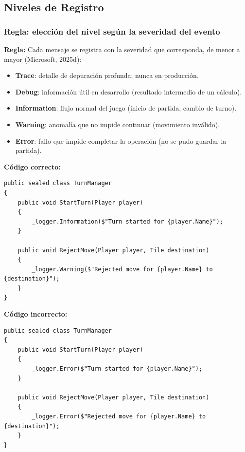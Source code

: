 \subsection{Niveles de Registro}

\subsubsection{Regla: elección del nivel según la severidad del evento}

\textbf{Regla:} Cada mensaje se registra con la severidad que corresponda, de menor a mayor (Microsoft, 2025d):

\begin{itemize}
  \item \textbf{Trace}: detalle de depuración profunda; nunca en producción.
  \item \textbf{Debug}: información útil en desarrollo (resultado intermedio de un cálculo).
  \item \textbf{Information}: flujo normal del juego (inicio de partida, cambio de turno).
  \item \textbf{Warning}: anomalía que no impide continuar (movimiento inválido).
  \item \textbf{Error}: fallo que impide completar la operación (no se pudo guardar la partida).
\end{itemize}

\textbf{Código correcto:}
\begin{lstlisting}[style=csharpstyle]
public sealed class TurnManager
{
    public void StartTurn(Player player)
    {
        _logger.Information($"Turn started for {player.Name}");
    }

    public void RejectMove(Player player, Tile destination)
    {
        _logger.Warning($"Rejected move for {player.Name} to {destination}");
    }
}
\end{lstlisting}

\textbf{Código incorrecto:}
\begin{lstlisting}[style=csharpstyle]
public sealed class TurnManager
{
    public void StartTurn(Player player)
    {
        _logger.Error($"Turn started for {player.Name}");
    }

    public void RejectMove(Player player, Tile destination)
    {
        _logger.Error($"Rejected move for {player.Name} to {destination}");
    }
}
\end{lstlisting}
